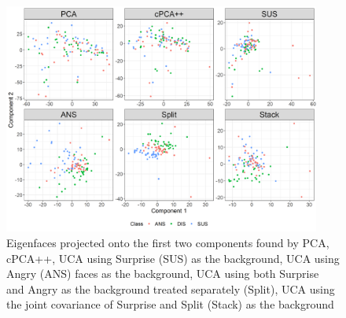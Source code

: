 \documentclass[12pt]{article}
\begin{document}
\begin{figure}[!th]
    \centering
	\includegraphics[width = 0.93\textwidth]{figure/F_Surprise_Angry_Disgust_projected.png}
	\caption{Eigenfaces projected onto the first two components found by PCA, cPCA++, UCA using Surprise (SUS) as the background, UCA using Angry (ANS) faces as the background, UCA using both Surprise and Angry as the background treated separately (Split), UCA using the joint covariance of Surprise and Split (Stack) as the background}
	\label{fig:Face_Projections}
\end{figure}

\end{document}
